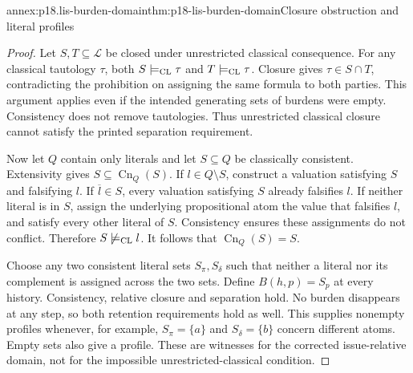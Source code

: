 \begin{annexitem}{annex:p18.lis-burden-domain}{thm:p18-lis-burden-domain}{Closure obstruction and literal profiles}
\begin{proof}
Let \(S,T\subseteq\mathcal L\) be closed under unrestricted
classical consequence. For any classical tautology \(\tau\),
both \(S\models_{\rm CL}\tau\) and \(T\models_{\rm CL}\tau\).
Closure gives \(\tau\in S\cap T\), contradicting the prohibition
on assigning the same formula to both parties.
This argument applies even if the intended generating sets of
burdens were empty. Consistency does not remove tautologies.
Thus unrestricted classical closure cannot satisfy the printed
separation requirement.

Now let \(Q\) contain only literals and let \(S\subseteq Q\)
be classically consistent. Extensivity gives
\(S\subseteq\operatorname{Cn}_Q(S)\).
If \(l\in Q\setminus S\), construct a valuation satisfying \(S\)
and falsifying \(l\).
If \(\overline l\in S\), every valuation satisfying \(S\)
already falsifies \(l\). If neither literal is in \(S\), assign
the underlying propositional atom the value that falsifies \(l\),
and satisfy every other literal of \(S\).
Consistency ensures these assignments do not conflict.
Therefore \(S\not\models_{\rm CL}l\).
It follows that \(\operatorname{Cn}_Q(S)=S\).

Choose any two consistent literal sets \(S_\pi,S_\delta\) such
that neither a literal nor its complement is assigned across
the two sets. Define \(B(h,p)=S_p\) at every history.
Consistency, relative closure and separation hold.
No burden disappears at any step, so both retention requirements
hold as well. This supplies nonempty profiles whenever, for
example, \(S_\pi=\{a\}\) and \(S_\delta=\{b\}\) concern different
atoms. Empty sets also give a profile.
These are witnesses for the corrected issue-relative domain,
not for the impossible unrestricted-classical condition.
\end{proof}
\end{annexitem}

